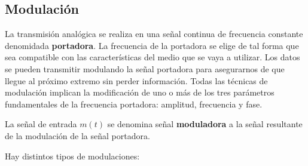 \subsection{Modulación}
La transmisión analógica se realiza en una señal continua de frecuencia constante  denomidada \textbf{portadora}. La frecuencia de la portadora se elige de tal forma que sea compatible con las características del medio que se vaya a utilizar. Los datos se pueden transmitir modulando la señal portadora para asegurarnos de que llegue al próximo extremo sin perder información. Todas las técnicas de modulación implican la modificación de uno o más de los tres parámetros fundamentales de la frecuencia portadora: amplitud, frecuencia y fase.

La señal de entrada \(m(t)\) se denomina señal \textbf{moduladora} a la señal resultante de la modulación de la señal portadora.

Hay distintos tipos de modulaciones:

